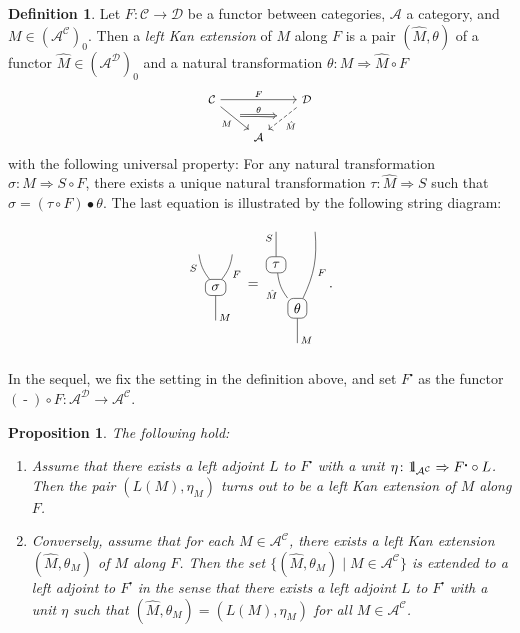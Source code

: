 \documentclass{surv-l}
\numberwithin{equation}{chapter}
\numberwithin{figure}{chapter}
\theoremstyle{plain}
\newtheorem{prp}[thm]{Proposition}
\theoremstyle{definition}
\newtheorem{dfn}[thm]{Definition}
\theoremstyle{remark}
\newcommand{\id}{1\kern-.25em{\text{{\rm l}}}}
\newcommand{\Ar}[3]{\ar[from={#1}, to={#2}, #3]}
\newcommand{\RN}{\node[rounded corners, draw]}
\newcommand{\SL}[3]{\ar[from={#1}, to={#2}, dash, #3]}
\newcommand{\RB}[3]{\ar[from={#1}, to={#2}, dash, bend right=15, #3]}
\newcommand{\LB}[3]{\ar[from={#1}, to={#2}, dash, bend left=15, #3]}
\DeclareMathOperator{\blank}{-}
\begin{document}
\begin{dfn}
Let $F \colon {\mathcal{C}} \to {\mathcal{D}}$ be a functor between categories, $\mathcal{A}$ a category,
and $M \in (\mathcal{A}^{{\mathcal{C}}})_0$.
Then a \emph{left Kan extension} of $M$ along $F$
is a pair $(\hat{M}, \theta)$ of a functor $\hat{M} \in (\mathcal{A}^{{\mathcal{D}}})_0$
and a natural transformation $\theta \colon M \Rightarrow \hat{M} \circ F$
\[\footnotesize
\begin{tikzcd}
{\mathcal{C}} &&{\mathcal{D}}\\
&\mathcal{A}
\Ar{1-1}{1-3}{"F"}
\Ar{1-1}{2-2}{"M"', ""{name=s}}
\Ar{1-3}{2-2}{"\hat{M}", ""'{name=t}, dashed}
\Ar{s}{t}{"\theta", Rightarrow}
\end{tikzcd}
\]
with the following universal property:
For any natural transformation $\sigma \colon M \Rightarrow S \circ F$,
there exists a unique natural transformation $\tau \colon \hat{M} \Rightarrow S$ such that
$\sigma = (\tau \circ F) \bullet \theta$.
The last equation is illustrated by the following string diagram:
\[
\begin{tikzcd}[column sep=0.1em]
{}&&{}\\
&\RN(si) {\sigma};&\\
&{}&
\RB{1-1}{si}{"S"' near start}
\SL{si}{3-2}{"M" very near end}
\RB{si}{1-3}{"F"'}
\end{tikzcd}
=
\begin{tikzcd}[column sep=0.1em]
{}&&{}\\
\RN(ta) {\tau};&&\\
&\RN(th) {\theta};&\\
&{}&
\SL{1-1}{ta}{"S"' near start}
\LB{th}{ta}{"\hat{M}"}
\SL{th}{4-2}{"M" very near end}
\RB{th}{1-3}{"F"'}
\end{tikzcd}.
\]
\end{dfn}

In the sequel, we fix the setting in the definition above, and set
$F^{\centerdot}$ as the functor $(\blank)\circ F \colon\mathcal{A}^{{\mathcal{D}}} \to \mathcal{A}^{{\mathcal{C}}}$.

\begin{prp}\label{prp:left-Kan-left-adj}
The following hold:
\begin{enumerate}
\item
Assume that there exists a left adjoint $L$ to $F^{\centerdot}$ with a unit $\eta \colon \id_{\mathcal{A}^{{\mathcal{C}}}} \Rightarrow F^{\centerdot} \circ L$.
Then the pair $(L(M), \eta_M)$ turns out to be a left Kan extension of $M$ along $F$.

\item Conversely, assume that for each $M \in \mathcal{A}^{{\mathcal{C}}}$, there exists a left Kan extension
$(\hat{M}, \theta_M)$ of $M$ along $F$.
Then the set $\{(\hat{M}, \theta_M) \mid M \in \mathcal{A}^{{\mathcal{C}}}\}$ is extended to a left adjoint to $F^{\centerdot}$ in the sense that
there exists a left adjoint $L$ to $F^{\centerdot}$ with a unit $\eta$ such that $(\hat{M}, \theta_M) = (L(M), \eta_M)$
for all $M \in \mathcal{A}^{{\mathcal{C}}}$.
\end{enumerate}
\end{prp}
\end{document}
